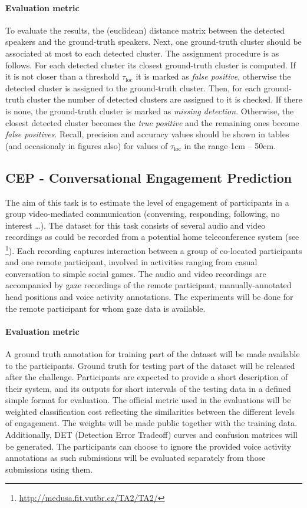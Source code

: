 \documentclass[a4paper]{article}
\begin{document}
\paragraph{Evaluation metric} To evaluate the results, the (euclidean) distance matrix between the detected speakers and
the ground-truth speakers. Next, one ground-truth cluster should be associated at most to each detected cluster. The
assignment procedure is as follows. For each detected cluster its closest ground-truth cluster is computed. If it is
not closer than a threshold $\tau_{\textrm{loc}}$ it is marked as \textit{false positive}, otherwise the detected
cluster is assigned to the ground-truth cluster. Then, for each ground-truth cluster the number of detected
clusters are assigned to it is checked. If there is none, the ground-truth cluster is marked as \textit{missing
detection}. Otherwise, the closest detected cluster becomes the \textit{true positive} and the remaining ones
become \textit{false positives}. Recall, precision and accuracy values should be shown in tables (and occasionaly in
figures also) for values of $\tau_\textrm{loc}$ in the range 1cm -- 50cm.

\subsection{CEP - Conversational Engagement Prediction}
The aim of this task is to estimate the level of engagement of participants in a group video-mediated communication
(conversing, responding, following, no interest …). The dataset for this task consists of several audio and video
recordings as could be recorded from a potential home teleconference system (see
\cite{Hadris12}\footnote{\url{http://medusa.fit.vutbr.cz/TA2/TA2/}}). Each recording captures interaction between a
group of co-located participants and one remote participant, involved in activities ranging from casual conversation to
simple social games. The audio and video recordings are accompanied by gaze recordings of the remote participant,
manually-annotated head positions and voice activity annotations. The experiments will be done for the remote
participant for whom gaze data is available.

\paragraph{Evaluation metric} A ground truth annotation for training part of the dataset will be made available to the
participants. Ground truth for testing part of the dataset will be released after the challenge. Participants are
expected to provide a short description of their system, and its outputs for short intervals of the testing data in a
defined simple format for evaluation. The official metric used in the evaluations will be weighted classification cost
reflecting the similarities between the different levels of engagement. The weights will be made public together with
the training data. Additionally, DET (Detection Error Tradeoff) curves and confusion matrices will be generated. The
participants can choose to ignore the provided voice activity annotations as such submissions will be evaluated
separately from those submissions using them.



\end{document}
